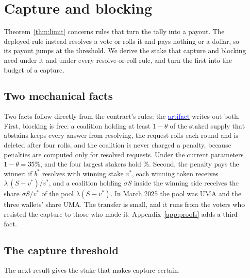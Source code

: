 \documentclass[conference,compsoc]{IEEEtran}
\newcommand{\artifactlink}[1]{\texorpdfstring{\href{https://github.com/submissionrepo/too-big-to-vote-on-artifact}{\textcolor{blue}{#1}}}{#1}}
\begin{document}
\section{Capture and blocking}
\label{sec:analysis}
 Theorem~\ref{thm:limit} concerns rules that turn the tally into a payout. The deployed rule instead resolves a vote or rolls it and pays nothing or a dollar, so its payout jumps at the threshold. We derive the stake that capture and blocking need under it and under every resolve-or-roll rule, and turn the first into the budget of a capture.

\subsection{Two mechanical facts}
\label{sec:facts}
 Two facts follow directly from the contract's rules; the \artifactlink{artifact} writes out both. First, blocking is free: a coalition holding at least $1-\theta$ of the staked supply that abstains keeps every answer from resolving, the request rolls each round and is deleted after four rolls, and the coalition is never charged a penalty, because penalties are computed only for resolved requests. Under the current parameters $1-\theta = 35\%$, and the four largest stakers hold \topFourPct\%. Second, the penalty pays the winner: if $b^{*}$ resolves with winning stake $v^{*}$, each winning token receives $\lambda\,(S - v^{*})/v^{*}$, and a coalition holding $\sigma S$ inside the winning side receives the share $\sigma S / v^{*}$ of the pool $\lambda (S - v^{*})$. In March 2025 the pool was \marchPool{} UMA and the three wallets' share \marchWhaleGain{} UMA. The transfer is small, and it runs from the voters who resisted the capture to those who made it. Appendix~\ref{app:proofs} adds a third fact.

\subsection{The capture threshold}
The next result gives the stake that makes capture certain.
\end{document}
